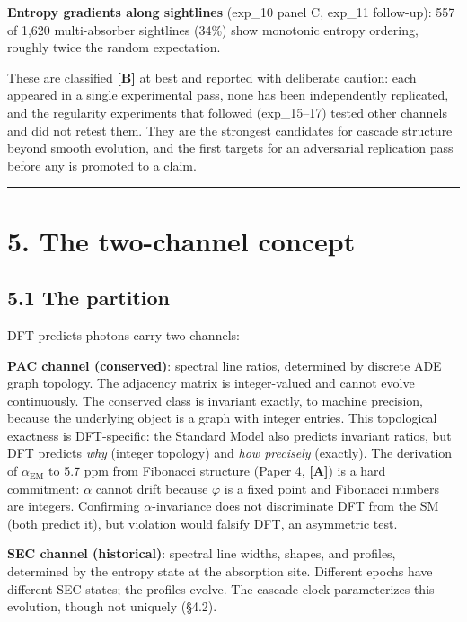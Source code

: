 \documentclass[11pt,a4paper]{article}
\begin{document}
\textbf{Entropy gradients along sightlines} (exp\_10 panel C, exp\_11 follow-up): 557 of 1,620 multi-absorber sightlines (34\%) show monotonic entropy ordering, roughly twice the random expectation.

These are classified \textbf{[B]} at best and reported with deliberate caution: each appeared in a single experimental pass, none has been independently replicated, and the regularity experiments that followed (exp\_15–17) tested other channels and did not retest them. They are the strongest candidates for cascade structure beyond smooth evolution, and the first targets for an adversarial replication pass before any is promoted to a claim.

\begin{center}\rule{0.5\linewidth}{0.4pt}\end{center}

\section*{5. The two-channel concept}

\subsection*{5.1 The partition}

DFT predicts photons carry two channels:

\textbf{PAC channel (conserved)}: spectral line ratios, determined by discrete ADE graph topology. The adjacency matrix is integer-valued and cannot evolve continuously. The conserved class is invariant exactly, to machine precision, because the underlying object is a graph with integer entries. This topological exactness is DFT-specific: the Standard Model also predicts invariant ratios, but DFT predicts \emph{why} (integer topology) and \emph{how precisely} (exactly). The derivation of $\alpha_\text{EM}$ to 5.7 ppm from Fibonacci structure (Paper 4, \textbf{[A]}) is a hard commitment: $\alpha$ cannot drift because $\varphi$ is a fixed point and Fibonacci numbers are integers. Confirming $\alpha$-invariance does not discriminate DFT from the SM (both predict it), but violation would falsify DFT, an asymmetric test.

\textbf{SEC channel (historical)}: spectral line widths, shapes, and profiles, determined by the entropy state at the absorption site. Different epochs have different SEC states; the profiles evolve. The cascade clock parameterizes this evolution, though not uniquely (§4.2).
\end{document}
